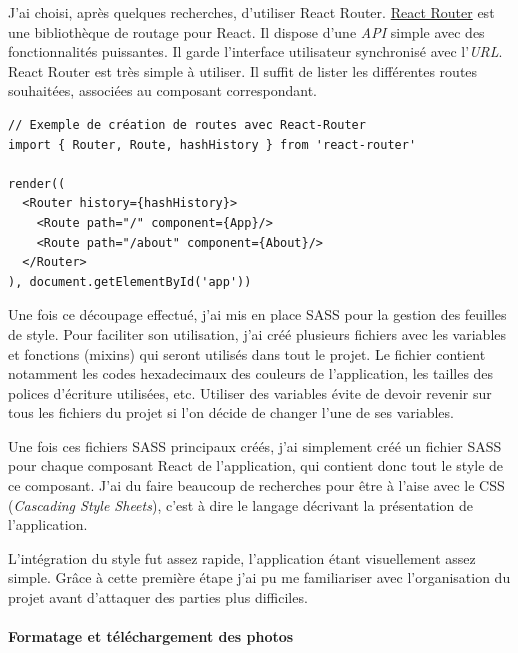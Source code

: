 \bigskip

J'ai choisi, après quelques recherches, d'utiliser React Router.
\href{https://github.com/ReactTraining/react-router}{React Router} est
une bibliothèque de routage pour React. Il dispose d'une \emph{API}
simple avec des fonctionnalités puissantes. Il garde l'interface
utilisateur synchronisé avec l'\emph{URL}. React Router est très simple
à utiliser. Il suffit de lister les différentes routes souhaitées,
associées au composant correspondant.

\begin{verbatim}
// Exemple de création de routes avec React-Router
import { Router, Route, hashHistory } from 'react-router'

render((
  <Router history={hashHistory}>
    <Route path="/" component={App}/>
    <Route path="/about" component={About}/>
  </Router>
), document.getElementById('app'))
\end{verbatim}

\bigskip

Une fois ce découpage effectué, j'ai mis en place SASS pour la gestion
des feuilles de style. Pour faciliter son utilisation, j'ai créé
plusieurs fichiers avec les variables et fonctions (mixins) qui seront
utilisés dans tout le projet. Le fichier contient notamment les codes
hexadecimaux des couleurs de l'application, les tailles des polices
d'écriture utilisées, etc. Utiliser des variables évite de devoir
revenir sur tous les fichiers du projet si l'on décide de changer l'une
de ses variables.

\bigskip

Une fois ces fichiers SASS principaux créés, j'ai simplement créé un
fichier SASS pour chaque composant React de l'application, qui contient
donc tout le style de ce composant. J'ai du faire beaucoup de recherches
pour être à l'aise avec le CSS (\emph{Cascading Style Sheets}), c'est à
dire le langage décrivant la présentation de l'application.

\bigskip

L'intégration du style fut assez rapide, l'application étant
visuellement assez simple. Grâce à cette première étape j'ai pu me
familiariser avec l'organisation du projet avant d'attaquer des parties
plus difficiles.

\bigskip

\paragraph{Formatage et téléchargement des
photos}\label{formatage-et-tuxe9luxe9chargement-des-photos}

